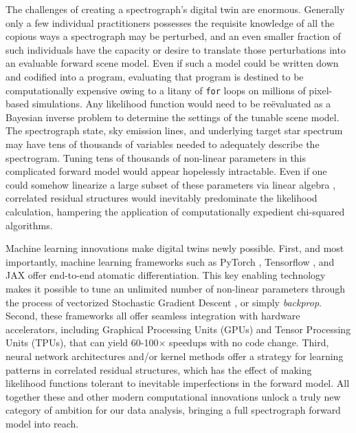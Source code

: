 \documentclass[twocolumn]{aastex631}
\begin{document}
The challenges of creating a spectrograph's digital twin are enormous.  Generally only a few individual practitioners possesses the requisite knowledge of all the copious ways a spectrograph may be perturbed, and an even smaller fraction of such individuals have the capacity or desire to translate those perturbations into an evaluable forward scene model.  Even if such a model could be written down and codified into a program, evaluating that program is destined to be computationally expensive owing to a litany of \texttt{for} loops on millions of pixel-based simulations.  Any likelihood function would need to be re\"evaluated as a Bayesian inverse problem to determine the settings of the tunable scene model.  The spectrograph state, sky emission lines, and underlying target star spectrum may have tens of thousands of variables needed to adequately describe the spectrogram.  Tuning tens of thousands of non-linear parameters in this complicated forward model would appear hopelessly intractable.  Even if one could somehow linearize a large subset of these parameters via linear algebra \citep{2010PASP..122..248B}, correlated residual structures would inevitably predominate the likelihood calculation, hampering the application of computationally expedient chi-squared algorithms.

Machine learning innovations make digital twins newly possible. First, and most importantly, machine learning frameworks such as PyTorch \citep{2019arXiv191201703P}, Tensorflow \citep{tensorflow2015-whitepaper}, and JAX \citep{jax2018github} offer end-to-end atomatic differentiation.  This key enabling technology makes it possible to tune an unlimited number of non-linear parameters through the process of vectorized Stochastic Gradient Descent \citep[SGD,][]{2016arXiv160904747R}, or simply \emph{backprop}.  Second, these frameworks all offer seamless integration with hardware accelerators, including Graphical Processing Units (GPUs) and Tensor Processing Units (TPUs), that can yield 60-100$\times$ speedups with no code change.  Third, neural network architectures and/or kernel methods offer a strategy for learning patterns in correlated residual structures, which has the effect of making likelihood functions tolerant to inevitable imperfections in the forward model.  All together these and other modern computational innovations unlock a truly new category of ambition for our data analysis, bringing a full spectrograph forward model into reach.
\end{document}
